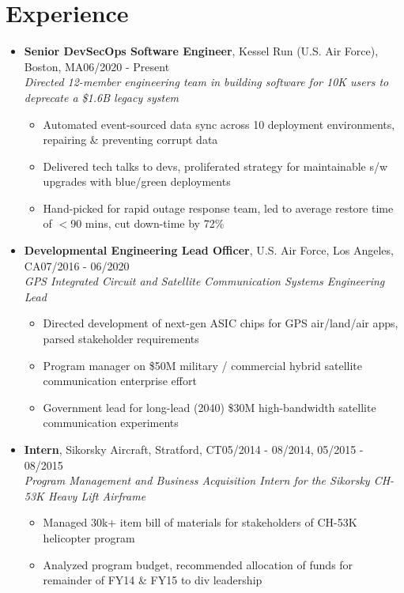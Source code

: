 \documentclass{article}
\begin{document}
\section{Experience} 
\begin{itemize}
    \itemsep0.2em
    \item \textbf{Senior DevSecOps Software Engineer}, Kessel Run (U.S. Air Force), Boston, MA\hfill 06/2020 - Present \\ \emph{Directed 12-member engineering team in building software for 10K users to deprecate a \$1.6B legacy system}
    \vspace{-\topsep} \vspace{0.2em}
    \begin{itemize}
        \itemsep0em
        \item Automated event-sourced data sync across 10 deployment environments, repairing \& preventing corrupt data
        \item Delivered tech talks to devs, proliferated strategy for maintainable s/w upgrades with blue/green deployments
        \item Hand-picked for rapid outage response team, led to average restore time of $<$90 mins, cut down-time by 72\%
    \end{itemize}
    
    \item \textbf{Developmental Engineering Lead Officer}, U.S. Air Force, Los Angeles, CA\hfill 07/2016 - 06/2020 \\ \emph{GPS Integrated Circuit and Satellite Communication Systems Engineering Lead}
    \vspace{-\topsep} \vspace{0.2em}
    \begin{itemize}
        \itemsep0em
        \item Directed development of next-gen ASIC chips for GPS air/land/air apps, parsed stakeholder requirements
        \item Program manager on \$50M military / commercial hybrid satellite communication enterprise effort
        \item Government lead for long-lead (2040) \$30M high-bandwidth satellite communication experiments
    \end{itemize}
    
    \item \textbf{Intern}, Sikorsky Aircraft, Stratford, CT\hfill 05/2014 - 08/2014, 05/2015 - 08/2015 \\ \emph{Program Management and Business Acquisition Intern for the Sikorsky CH-53K Heavy Lift Airframe}
    \vspace{-\topsep} \vspace{0.2em}
    \begin{itemize}
        \itemsep0em
        \item Managed 30k+ item bill of materials for stakeholders of CH-53K helicopter program
        \item Analyzed program budget, recommended allocation of funds for remainder of FY14 \& FY15 to div leadership
    \end{itemize} \end{itemize} 
\end{document}
